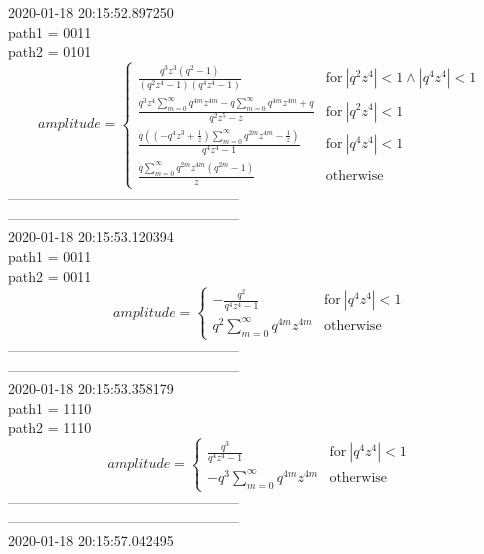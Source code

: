 \documentclass{jsreport}
\begin{document}
2020-01-18 20:15:52.897250\\
path1 = 0011\\
path2 = 0101\\
$$amplitude = \begin{cases} \frac{q^{3} z^{3} \left(q^{2} - 1\right)}{\left(q^{2} z^{4} - 1\right) \left(q^{4} z^{4} - 1\right)} & \text{for}\: \left|{q^{2} z^{4}}\right| < 1 \wedge \left|{q^{4} z^{4}}\right| < 1 \\\frac{q^{3} z^{4} \sum_{m=0}^{\infty} q^{4 m} z^{4 m} - q \sum_{m=0}^{\infty} q^{4 m} z^{4 m} + q}{q^{2} z^{5} - z} & \text{for}\: \left|{q^{2} z^{4}}\right| < 1 \\\frac{q \left(\left(- q^{4} z^{3} + \frac{1}{z}\right) \sum_{m=0}^{\infty} q^{2 m} z^{4 m} - \frac{1}{z}\right)}{q^{4} z^{4} - 1} & \text{for}\: \left|{q^{4} z^{4}}\right| < 1 \\\frac{q \sum_{m=0}^{\infty} q^{2 m} z^{4 m} \left(q^{2 m} - 1\right)}{z} & \text{otherwise} \end{cases}$$
--------------------------------------------------\\
--------------------------------------------------\\
2020-01-18 20:15:53.120394\\
path1 = 0011\\
path2 = 0011\\
$$amplitude = \begin{cases} - \frac{q^{2}}{q^{4} z^{4} - 1} & \text{for}\: \left|{q^{4} z^{4}}\right| < 1 \\q^{2} \sum_{m=0}^{\infty} q^{4 m} z^{4 m} & \text{otherwise} \end{cases}$$
--------------------------------------------------\\
--------------------------------------------------\\
2020-01-18 20:15:53.358179\\
path1 = 1110\\
path2 = 1110\\
$$amplitude = \begin{cases} \frac{q^{3}}{q^{4} z^{4} - 1} & \text{for}\: \left|{q^{4} z^{4}}\right| < 1 \\- q^{3} \sum_{m=0}^{\infty} q^{4 m} z^{4 m} & \text{otherwise} \end{cases}$$
--------------------------------------------------\\
--------------------------------------------------\\
2020-01-18 20:15:57.042495\\
\end{document}
